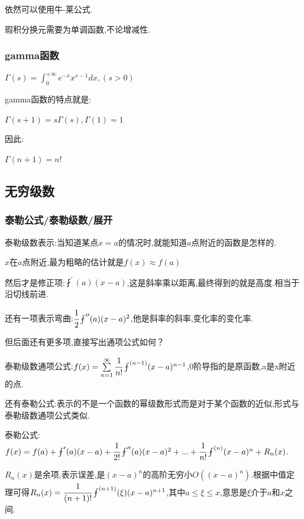 \documentclass[UTF8,12pt]{ctexbook}
\newcommand{\derivative}{^\prime}
\newcommand{\doubleDerivative}{^{\prime\prime}}
\newcommand{\aLotDerivative}[1]{^{(#1)}}
\newcommand{\upDownSum}[2]{\sum\limits_{#2}^{#1}}
\newcommand{\fDerivative}[1]{\fint\derivative(#1)}
\newcommand{\defFunction}[1]{f(#1)}
\newcommand{\definiteIntegral}[2]{\int^{#1}_{#2}}
\begin{document}
{{{{  依然可以使用牛-莱公式.

  瑕积分换元需要为单调函数,不论增减性.

}%

\subsubsection{gamma函数}{
$\varGamma(s) = \definiteIntegral{+\infty}{0}e^{-x}x^{s-1}dx, (s > 0)$

gamma函数的特点就是:

$\varGamma(s + 1) = s\varGamma(s), \varGamma(1) = 1$

因此:

$\varGamma(n+1) = n!$

}%

}%

\subsection{无穷级数}{

\subsubsection{泰勒公式/泰勒级数/展开}{
泰勒级数表示:当知道某点$x = a$的情况时,就能知道$a$点附近的函数是怎样的.

$x$在$a$点附近,最为粗略的估计就是$\defFunction{x} \approx \defFunction{a}$

然后才是修正项:$\fDerivative{a}(x - a)$,这是斜率乘以距离,最终得到的就是高度.相当于沿切线前进.

还有一项表示弯曲:$\cfrac{1}{2}\fint\doubleDerivative(a)(x - a)^2$,他是斜率的斜率,变化率的变化率.

但后面还有更多项,直接写出通项公式如何？

泰勒级数通项公式:$\defFunction{x} = \upDownSum{\infty}{n = 1}\cfrac{1}{n!}\fint\aLotDerivative{n - 1}(x - a)^{n - 1}$,0阶导指的是原函数,a是x附近的点.

还有泰勒公式:表示的不是一个函数的幂级数形式而是对于某个函数的近似,形式与泰勒级数通项公式类似.

泰勒公式:$\defFunction{x} = \defFunction{a} + \fDerivative{a}(x - a) + \cfrac{1}{2!}\fint\doubleDerivative(a)(x - a)^2 + ... + \cfrac{1}{n!}\fint\aLotDerivative{n}(x - a)^n + R_n(x)$.

$R_n(x)$是余项,表示误差,是$(x - a)^n$的高阶无穷小$O((x - a)^n)$.根据中值定理可得$R_n(x) = \cfrac{1}{(n + 1)!}\fint\aLotDerivative{n + 1}(\xi)(x - a)^{n+1}$,其中$a \leq \xi \leq x$,意思是$\xi$介于$a$和$x$之间.

}}}}
\end{document}
